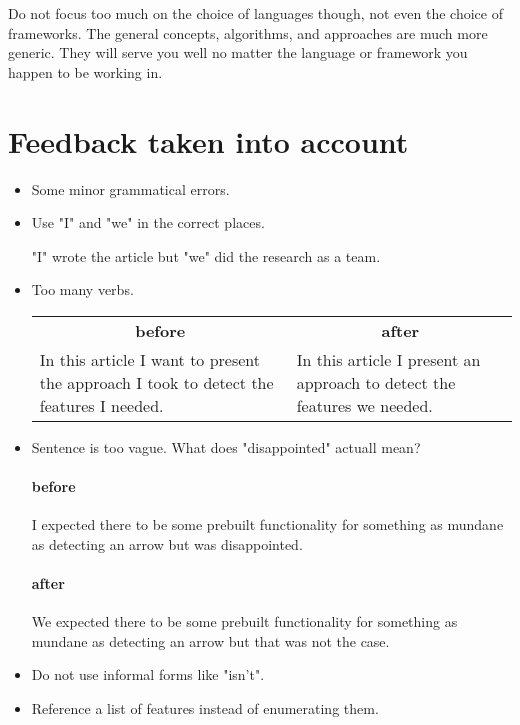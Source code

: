 \documentclass[12pt, a4paper]{article}
\begin{document}
Do not focus too much on the choice of languages though, not even the choice of frameworks. The general concepts, algorithms, and approaches are much more generic. They will serve you well no matter the language or framework you happen to be working in.

\printbibliography

\section{Feedback taken into account}
\begin{itemize}
	\item Some minor grammatical errors.
	\item Use "I" and "we" in the correct places.

	"I" wrote the article but "we" did the research as a team.
	\item Too many verbs.

	\begin{tabular}{p{.5\linewidth} p{.5\linewidth}}
		\multicolumn{1}{c}{\textbf{before}} & \multicolumn{1}{c}{\textbf{after}}\\
		In this article I want to present the approach I took to detect the features I needed.&
		In this article I present an approach to detect the features we needed.\\
	\end{tabular}

	\item Sentence is too vague. What does "disappointed" actuall mean?

	\begin{multicols}{2}
		\paragraph{before} I expected there to be some prebuilt functionality for something as mundane as detecting an arrow but was disappointed.

		\paragraph{after} We expected there to be some prebuilt functionality for something as mundane as detecting an arrow but that was not the case.
	\end{multicols}
	\item Do not use informal forms like "isn't".
	\item Reference a list of features instead of enumerating them.


\end{itemize}
\end{document}
